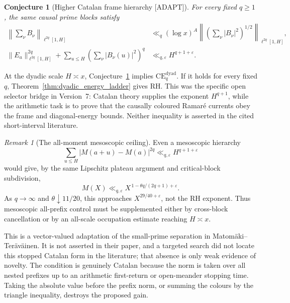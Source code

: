 \documentclass[11pt]{amsart}
\numberwithin{equation}{section}
\theoremstyle{plain}
\newtheorem{conjecture}[theorem]{Conjecture}
\theoremstyle{definition}
\theoremstyle{remark}
\newtheorem{remark}[theorem]{Remark}
\newcommand{\Mert}{M}
\newcommand{\eps}{\varepsilon}
\begin{document}
\begin{conjecture}[Higher Catalan frame hierarchy \textnormal{[ADAPT]}]
\label{conj:higher_catalan_frame}
For every fixed $q\geq1$, the same causal prime blocks satisfy
\begin{align}
 \left\|\sum_\nu B_\nu\right\|_{\ell^{2q}[1,H]}
 &\ll_{q}(\log x)^A
 \left\|\left(\sum_\nu|B_\nu|^2\right)^{1/2}
 \right\|_{\ell^{2q}[1,H]},
\label{eq:higher_frame}\\
 \|E_a\|_{\ell^{2q}[1,H]}^{2q}
 +\sum_{u\leq H}\left(\sum_\nu|B_\nu(u)|^2\right)^q
 &\ll_{q,\eps}H^{q+1+\eps}.
\label{eq:higher_diagonal_energy}
\end{align}
\end{conjecture}

At the dyadic scale $H\asymp x$, Conjecture~\ref{conj:higher_catalan_frame}
implies $\mathrm{CE}^{\mathrm{dyad}}_q$.  If it holds for every fixed $q$,
Theorem~\ref{thm:dyadic_energy_ladder} gives RH.  This was the specific open
selector bridge in Version~7: Catalan theory supplies the exponent
$H^{q+1}$, while the arithmetic task is to prove that the causally coloured
Ramar\'e currents obey the frame and diagonal-energy bounds.  Neither
inequality is asserted in the cited short-interval literature.

\begin{remark}[The all-moment mesoscopic ceiling]
\label{rem:mesoscopic_moment_ceiling}
Even a mesoscopic hierarchy
\begin{equation}
 \sum_{u\leq H}|\Mert(a+u)-\Mert(a)|^{2q}
 \ll_{q,\eps}H^{q+1+\eps}
\end{equation}
would give, by the same Lipschitz plateau argument and critical-block
subdivision,
\begin{equation}
 \Mert(X)\ll_{q,\eps}
 X^{\,1-\theta q/(2q+1)+\eps}.
\end{equation}
As $q\to\infty$ and $\theta\downarrow11/20$, this approaches
$X^{29/40+\eps}$, not the RH exponent.  Thus mesoscopic all-prefix control
must be supplemented either by cross-block cancellation or by an all-scale
occupation estimate reaching $H\asymp x$.
\end{remark}

This is a vector-valued adaptation of the small-prime separation in
Matom\"aki--Ter\"av\"ainen.  It is not asserted in their paper, and a targeted
search did not locate this stopped Catalan form in the literature; that
absence is only weak evidence of novelty.  The condition is genuinely
Catalan because the norm is taken over all nested prefixes up to an arithmetic
first-return or open-meander stopping time.  Taking the absolute value before
the prefix norm, or summing the colours by the triangle inequality, destroys
the proposed gain.
\end{document}
